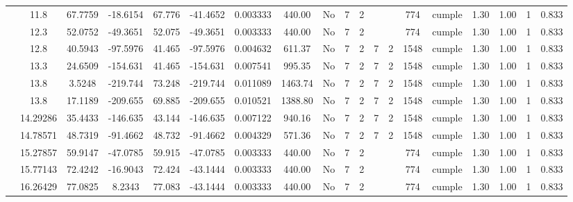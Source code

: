 \begin{table}[H]
{\begin{tabular}{|c|c|c|c|c|c|r|c|c|c|c|c|c|c|c|c|c|c|c|}
\cline{2-19}        & 11.8 & 67.7759 & -18.6154 & 67.776 & -41.4652 & 0.003333 & 440.00 & No  & 7   & 2   &     &     & 774 & \cellcolor[rgb]{ .776,  .937,  .808}cumple & 1.30 & 1.00 & 1   & 0.833 \bigstrut\\
\cline{2-19}        & 12.3 & 52.0752 & -49.3651 & 52.075 & -49.3651 & 0.003333 & 440.00 & No  & 7   & 2   &     &     & 774 & \cellcolor[rgb]{ .776,  .937,  .808}cumple & 1.30 & 1.00 & 1   & 0.833 \bigstrut\\
\cline{2-19}        & 12.8 & 40.5943 & -97.5976 & 41.465 & -97.5976 & 0.004632 & 611.37 & No  & 7   & 2   & 7   & 2   & 1548 & \cellcolor[rgb]{ .776,  .937,  .808}cumple & 1.30 & 1.00 & 1   & 0.833 \bigstrut\\
\cline{2-19}        & 13.3 & 24.6509 & -154.631 & 41.465 & -154.631 & 0.007541 & 995.35 & No  & 7   & 2   & 7   & 2   & 1548 & \cellcolor[rgb]{ .776,  .937,  .808}cumple & 1.30 & 1.00 & 1   & 0.833 \bigstrut\\
\cline{2-19}        & \cellcolor[rgb]{ .851,  .882,  .949}13.8 & 3.5248 & -219.744 & 73.248 & -219.744 & 0.011089 & 1463.74 & No  & 7   & 2   & 7   & 2   & 1548 & \cellcolor[rgb]{ .776,  .937,  .808}cumple & 1.30 & 1.00 & 1   & 0.833 \bigstrut\\
\cline{2-19}        & \cellcolor[rgb]{ .851,  .882,  .949}13.8 & 17.1189 & -209.655 & 69.885 & -209.655 & 0.010521 & 1388.80 & No  & 7   & 2   & 7   & 2   & 1548 & \cellcolor[rgb]{ .776,  .937,  .808}cumple & 1.30 & 1.00 & 1   & 0.833 \bigstrut\\
\cline{2-19}        & 14.29286 & 35.4433 & -146.635 & 43.144 & -146.635 & 0.007122 & 940.16 & No  & 7   & 2   & 7   & 2   & 1548 & \cellcolor[rgb]{ .776,  .937,  .808}cumple & 1.30 & 1.00 & 1   & 0.833 \bigstrut\\
\cline{2-19}        & 14.78571 & 48.7319 & -91.4662 & 48.732 & -91.4662 & 0.004329 & 571.36 & No  & 7   & 2   & 7   & 2   & 1548 & \cellcolor[rgb]{ .776,  .937,  .808}cumple & 1.30 & 1.00 & 1   & 0.833 \bigstrut\\
\cline{2-19}        & 15.27857 & 59.9147 & -47.0785 & 59.915 & -47.0785 & 0.003333 & 440.00 & No  & 7   & 2   &     &     & 774 & \cellcolor[rgb]{ .776,  .937,  .808}cumple & 1.30 & 1.00 & 1   & 0.833 \bigstrut\\
\cline{2-19}        & 15.77143 & 72.4242 & -16.9043 & 72.424 & -43.1444 & 0.003333 & 440.00 & No  & 7   & 2   &     &     & 774 & \cellcolor[rgb]{ .776,  .937,  .808}cumple & 1.30 & 1.00 & 1   & 0.833 \bigstrut\\
\cline{2-19}        & 16.26429 & 77.0825 & 8.2343 & 77.083 & -43.1444 & 0.003333 & 440.00 & No  & 7   & 2   &     &     & 774 & \cellcolor[rgb]{ .776,  .937,  .808}cumple & 1.30 & 1.00 & 1   & 0.833 \bigstrut\\

\end{tabular}}
\end{table}
